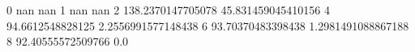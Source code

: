 0 nan nan
1 nan nan
2 138.2370147705078 45.831459045410156
4 94.6612548828125 2.2556991577148438
6 93.70370483398438 1.2981491088867188
8 92.40555572509766 0.0
